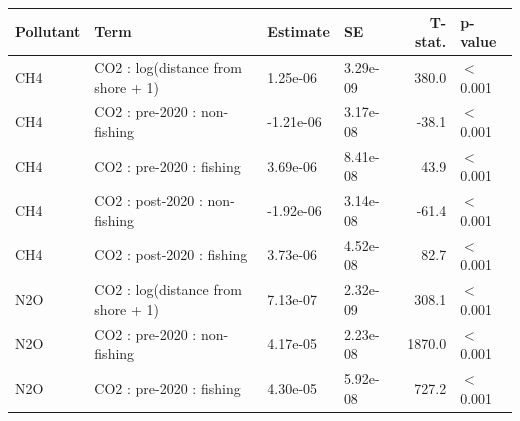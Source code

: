 \documentclass[lineno,pdflatex,sn-nature]{sn-jnl}
\providecommand{\DIFaddbeginFL}{} %
\providecommand{\DIFdelendFL}{} %
\providecommand{\DIFaddincludegraphics}[2][]{{\color{blue}\fbox{\DIFOincludegraphics[#1]{#2}}}} %
\DeclareRobustCommand{\DIFaddbeginFL}{\DIFOaddbeginFL \let\includegraphics\DIFaddincludegraphics} %
\DeclareRobustCommand{\DIFdelendFL}{\DIFOaddendFL \let\includegraphics\DIFOincludegraphics} %
\begin{document}
\begin{table}[!h]
\DIFdelendFL \DIFaddbeginFL \begin{tabular}[t]{l|l|l|l|r|l}
\hline
Pollutant & Term & Estimate & SE & T-stat. & p-value\\
\hline
CH4 & CO2 : log(distance from shore + 1) & 1.25e-06 & 3.29e-09 & 380.0 & $<$0.001\\
\hline
CH4 & CO2 : pre-2020 : non-fishing & -1.21e-06 & 3.17e-08 & -38.1 & $<$0.001\\
\hline
CH4 & CO2 : pre-2020 : fishing & 3.69e-06 & 8.41e-08 & 43.9 & $<$0.001\\
\hline
CH4 & CO2 : post-2020 : non-fishing & -1.92e-06 & 3.14e-08 & -61.4 & $<$0.001\\
\hline
CH4 & CO2 : post-2020 : fishing & 3.73e-06 & 4.52e-08 & 82.7 & $<$0.001\\
\hline
N2O & CO2 : log(distance from shore + 1) & 7.13e-07 & 2.32e-09 & 308.1 & $<$0.001\\
\hline
N2O & CO2 : pre-2020 : non-fishing & 4.17e-05 & 2.23e-08 & 1870.0 & $<$0.001\\
\hline
N2O & CO2 : pre-2020 : fishing & 4.30e-05 & 5.92e-08 & 727.2 & $<$0.001\\

\end{tabular}
\end{table}
\end{document}
